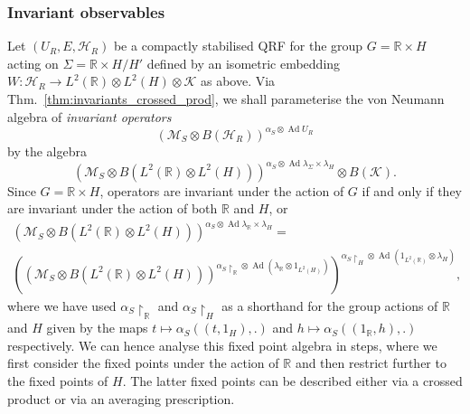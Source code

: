 \documentclass[sn-mathphys-num]{sn-jnl}%
\newcommand{\RR}{\mathbb{R}}
\newcommand{\HH}{\mathcal{H}}
\newcommand{\KK}{\mathcal{K}}
\newcommand{\MM}{\mathcal{M}}
\DeclareMathOperator{\Ad}{Ad}
\numberwithin{equation}{section}
\theoremstyle{thmstyleone}%
\theoremstyle{thmstyletwo}%
\theoremstyle{thmstylethree}%
\begin{document}
\subsubsection{Invariant observables}
\label{sec:RHinv_obs}
Let $( U_{R} , E ,\mathcal{H}_{R} )$ be a compactly stabilised QRF for the group $G=\RR\times H$ acting on $\Sigma=\RR\times H/H'$ defined by an isometric embedding $W:\HH_R\to L^2(\RR)\otimes L^2(H)\otimes \KK$ as above. Via Thm.~\ref{thm:invariants_crossed_prod}, we shall parameterise the von Neumann algebra of \emph{invariant operators} 
\begin{equation}
    ( \MM_S \otimes B(\mathcal{H}_{R}) )^{\alpha_S\otimes \Ad U_R}
\end{equation} by the algebra 
\begin{equation}
    (\MM_S\otimes B(L^2(\RR)\otimes L^2(H)))^{\alpha_S\otimes \Ad \lambda_\Sigma\times \lambda_H}\otimes B(\KK).
\end{equation} Since $G=\RR\times H$, operators are invariant under the action of $G$ if and only if they are invariant under the action of both $\RR$ and $H$, or
\begin{multline}
\label{eq:RHfixedpt}
    (\MM_S\otimes B(L^2(\RR)\otimes L^2(H)))^{\alpha_S\otimes \Ad \lambda_\RR\times \lambda_H}=\\\left((\MM_S\otimes B(L^2(\RR)\otimes L^2(H)))^{\alpha_S\restriction_{\RR}\otimes \Ad (\lambda_{\RR}\otimes 1_{L^2(H)})}\right)^{\alpha_S\restriction_H\otimes \Ad (1_{L^2(\RR)}\otimes \lambda_H)},
\end{multline}
where we have used $\alpha_S\restriction_\RR$ and $\alpha_S\restriction_H$ as a shorthand for the group actions of $\RR$ and $H$ given by the maps $t\mapsto \alpha_S((t,1_H),.)$ and $h\mapsto \alpha_S((1_\RR,h),.)$ respectively. We can hence analyse this fixed point algebra in steps, where we first consider the fixed points under the action of $\RR$ and then restrict further to the fixed points of $H$. The latter fixed points can be described either via a crossed product or via an averaging prescription.
\end{document}
